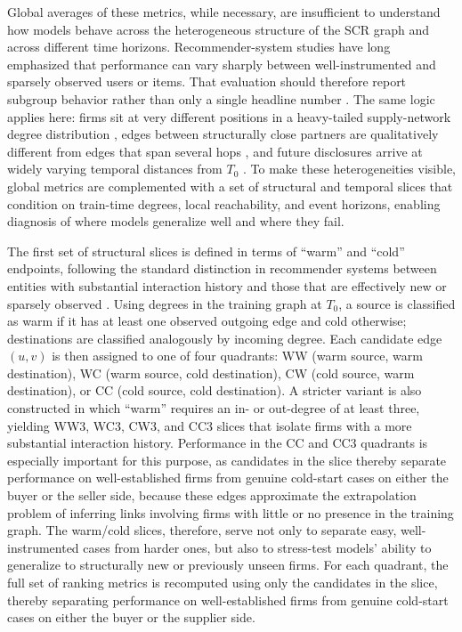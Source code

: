 Global averages of these metrics, while necessary, are insufficient to understand how models behave across the heterogeneous structure of the SCR graph and across different time horizons. Recommender-system studies have long emphasized that performance can vary sharply between well-instrumented and sparsely observed users or items. That evaluation should therefore report subgroup behavior rather than only a single headline number \parencite{herlocker_evaluating_2004,shani_evaluating_2011,schein_methods_2002}. The same logic applies here: firms sit at very different positions in a heavy-tailed supply-network degree distribution \parencite{barabasi_emergence_1999}, edges between structurally close partners are qualitatively different from edges that span several hops \parencite{liben-nowell_link_2003,lu_link_2011}, and future disclosures arrive at widely varying temporal distances from $T_0$ \parencite{holme_temporal_2012}. To make these heterogeneities visible, global metrics are complemented with a set of structural and temporal slices that condition on train-time degrees, local reachability, and event horizons, enabling diagnosis of where models generalize well and where they fail.

The first set of structural slices is defined in terms of ``warm'' and ``cold'' endpoints, following the standard distinction in recommender systems between entities with substantial interaction history and those that are effectively new or sparsely observed \parencite{schein_methods_2002,shani_evaluating_2011}. Using degrees in the training graph at $T_0$, a source is classified as warm if it has at least one observed outgoing edge and cold otherwise; destinations are classified analogously by incoming degree. Each candidate edge $(u,v)$ is then assigned to one of four quadrants: WW (warm source, warm destination), WC (warm source, cold destination), CW (cold source, warm destination), or CC (cold source, cold destination). A stricter variant is also constructed in which ``warm'' requires an in- or out-degree of at least three, yielding WW3, WC3, CW3, and CC3 slices that isolate firms with a more substantial interaction history. Performance in the CC and CC3 quadrants is especially important for this purpose, as candidates in the slice thereby separate performance on well-established firms from genuine cold-start cases on either the buyer or the seller side, because these edges approximate the extrapolation problem of inferring links involving firms with little or no presence in the training graph. The warm/cold slices, therefore, serve not only to separate easy, well-instrumented cases from harder ones, but also to stress-test models' ability to generalize to structurally new or previously unseen firms. For each quadrant, the full set of ranking metrics is recomputed using only the candidates in the slice, thereby separating performance on well-established firms from genuine cold-start cases on either the buyer or the supplier side.


